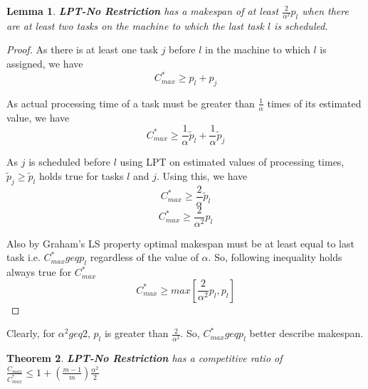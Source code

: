 \documentclass[10pt, conference, compsocconf]{IEEEtran}
\newtheorem{theorem}{Theorem}[section]
\newtheorem{lemma}[theorem]{Lemma}
\begin{document}
\begin{lemma}
 \textbf{LPT-No Restriction} has a makespan of at least $ {\frac{2}{\alpha^{2}}} p_l $ when there are at least two tasks on the machine to which the last task $l$ is scheduled. 
\end{lemma}
\begin{proof}
As there is at least one task $j$ before $l$ in the machine to which $l$ is assigned, we have
\begin{equation}\nonumber
C_{max}^{*}\geq p_l + p_j
\end{equation}	

As actual processing time of a task must be greater than $\frac{1}{\alpha}$ times of its estimated value, we have
\begin{equation}\nonumber 
C_{max}^{*} \geq \frac{1}{\alpha}\tilde p_l +  \frac{1}{\alpha} \tilde p_j 
\end{equation}

As $j$ is scheduled before $l$ using LPT on estimated values of processing times,  $\tilde p_j\geq   \tilde p_l$ holds true for tasks $l$ and $j$.  Using this, we have
\begin{equation}\nonumber
 C_{max}^{*} \geq \frac{2}{\alpha}\tilde p_l
 \end{equation}
\begin{equation}
 C_{max}^{*} \geq {\frac{2}{\alpha^{2}}} p_l  \end{equation}

Also by Graham's LS property optimal makespan must be at least equal to last task i.e. $C_{max}^{*} geq  p_l$ regardless of the value of $\alpha$.  So, following inequality holds always true for $C_{max}^{*}$
\begin{equation}
C_{max}^{*} \geq max[{\frac{2}{\alpha^{2}}} p_l, p_l] 
 \end{equation}
 \end{proof}

Clearly, for $\alpha^2 geq 2$,   $p_l$ is greater than ${\frac{2}{\alpha^{2}}}$.  So,  $C_{max}^{*} geq  p_l$ better describe makespan. 

\begin{theorem}
\textbf{LPT-No Restriction} has a competitive  ratio of  $\frac{C_{max}}{C_{max}^{*}} \leq 1 + (\frac{m-1}{m})\frac{\alpha^{2}}{2}$
\end{theorem} 
\end{document}
